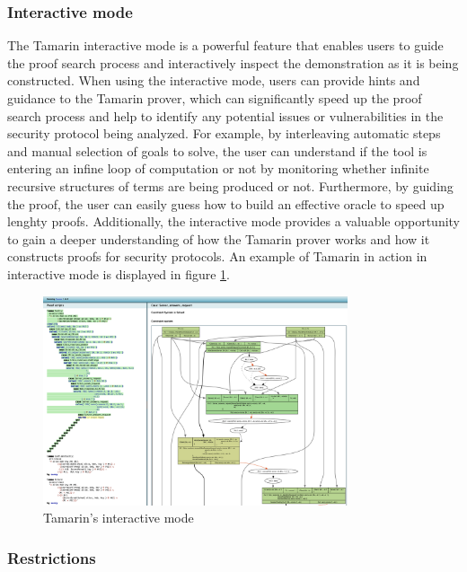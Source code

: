 \documentclass{article}
\begin{document}
\subsubsection{Interactive mode}\label{subsec:tamarinGui}

The Tamarin interactive mode is a powerful feature that enables users to guide the proof search process and interactively inspect the demonstration as it is being constructed. When using the interactive mode, users can provide hints and guidance to the Tamarin prover, which can significantly speed up the proof search process and help to identify any potential issues or vulnerabilities in the security protocol being analyzed. For example, by interleaving automatic steps and manual selection of goals to solve, the user can understand if the tool is entering an infine loop of computation or not by monitoring whether infinite recursive structures of terms are being produced or not. Furthermore, by guiding the proof, the user can easily guess how to build an effective oracle to speed up lenghty proofs. Additionally, the interactive mode provides a valuable opportunity to gain a deeper understanding of how the Tamarin prover works and how it constructs proofs for security protocols. An example of Tamarin in action in interactive mode is displayed in figure \ref{fig:interactive}.

\begin{figure}
    \centering
    \includegraphics[width=0.8\textwidth]{images/gui.png}
    \caption{Tamarin's interactive mode}
    \label{fig:interactive}
\end{figure}

\subsubsection{Restrictions}
\end{document}
